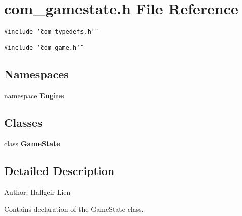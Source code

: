 \section{com\_\-gamestate.h File Reference}
\label{com__gamestate_8h}
{\tt \#include \char`\"{}com\_\-typedefs.h\char`\"{}}\par
{\tt \#include \char`\"{}com\_\-game.h\char`\"{}}\par
\subsection*{Namespaces}
\begin{CompactItemize}
\item 
namespace {\bf Engine}
\end{CompactItemize}
\subsection*{Classes}
\begin{CompactItemize}
\item 
class {\bf GameState}
\end{CompactItemize}


\subsection{Detailed Description}
\begin{Desc}
\item[Author:]Hallgeir Lien\end{Desc}
Contains declaration of the GameState class. 